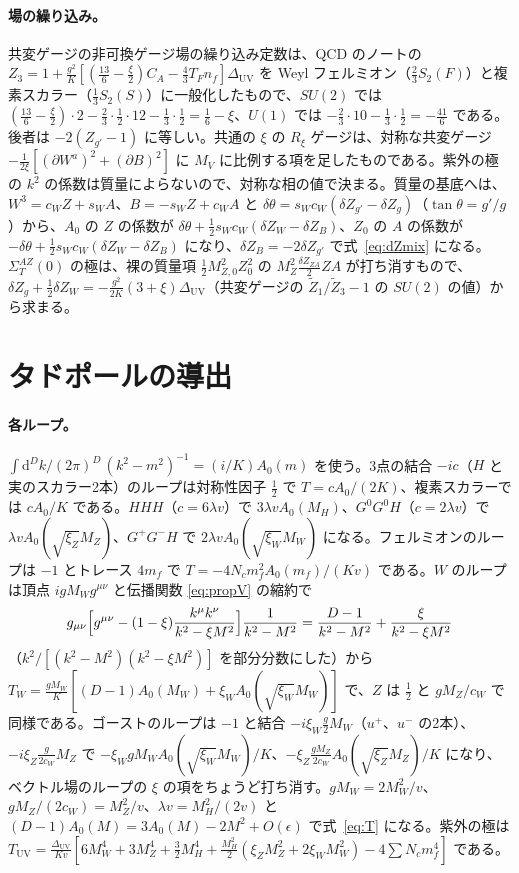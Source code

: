 \documentclass[a4paper,10pt]{ltjsarticle}
\newcommand{\dd}{\mathrm{d}}
\newcommand{\DUV}{\Delta_{\mathrm{UV}}}
\newcommand{\sw}{s_W}
\newcommand{\cw}{c_W}
\begin{document}
\paragraph{場の繰り込み。}共変ゲージの非可換ゲージ場の繰り込み定数は、QCD のノートの $Z_3=1+\frac{g^2}K[(\frac{13}6-\frac\xi2)C_A-\frac43T_Fn_f]\DUV$ を Weyl フェルミオン（$\frac23S_2(F)$）と複素スカラー（$\frac13S_2(S)$）に一般化したもので、$SU(2)$ では $(\frac{13}6-\frac\xi2)\cdot2-\frac23\cdot\frac12\cdot12-\frac13\cdot\frac12=\frac16-\xi$、$U(1)$ では $-\frac23\cdot10-\frac13\cdot\frac12=-\frac{41}6$ である。後者は $-2(Z_{g'}-1)$ に等しい。共通の $\xi$ の $R_\xi$ ゲージは、対称な共変ゲージ $-\frac1{2\xi}[(\partial W^a)^2+(\partial B)^2]$ に $M_V$ に比例する項を足したものである。紫外の極の $k^2$ の係数は質量によらないので、対称な相の値で決まる。質量の基底へは、$W^3=\cw Z+\sw A$、$B=-\sw Z+\cw A$ と $\delta\theta=\sw\cw(\delta Z_{g'}-\delta Z_g)$（$\tan\theta=g'/g$）から、$A_0$ の $Z$ の係数が $\delta\theta+\frac12\sw\cw(\delta Z_W-\delta Z_B)$、$Z_0$ の $A$ の係数が $-\delta\theta+\frac12\sw\cw(\delta Z_W-\delta Z_B)$ になり、$\delta Z_B=-2\delta Z_{g'}$ で式~\eqref{eq:dZmix} になる。$\Sigma^{AZ}_T(0)$ の極は、裸の質量項 $\frac12M_{Z,0}^2Z_0^2$ の $M_Z^2\frac{\delta Z_{ZA}}2ZA$ が打ち消すもので、$\delta Z_g+\frac12\delta Z_W=-\frac{g^2}{2K}(3+\xi)\DUV$（共変ゲージの $\tilde Z_1/\tilde Z_3-1$ の $SU(2)$ の値）から求まる。

\section{タドポールの導出}\label{app:tadpole}

\paragraph{各ループ。}$\int\dd^Dk/(2\pi)^D\,(k^2-m^2)^{-1}=(i/K)A_0(m)$ を使う。3点の結合 $-ic$（$H$ と実のスカラー2本）のループは対称性因子 $\frac12$ で $T=cA_0/(2K)$、複素スカラーでは $cA_0/K$ である。$HHH$（$c=6\lambda v$）で $3\lambda vA_0(M_H)$、$G^0G^0H$（$c=2\lambda v$）で $\lambda vA_0(\sqrt{\xi_Z}M_Z)$、$G^+G^-H$ で $2\lambda vA_0(\sqrt{\xi_W}M_W)$ になる。フェルミオンのループは $-1$ とトレース $4m_f$ で $T=-4N_cm_f^2A_0(m_f)/(Kv)$ である。$W$ のループは頂点 $igM_Wg^{\mu\nu}$ と伝播関数 \eqref{eq:propV} の縮約で
\begin{equation*}
g_{\mu\nu}\Bigl[g^{\mu\nu}-(1-\xi)\frac{k^\mu k^\nu}{k^2-\xi M^2}\Bigr]\frac1{k^2-M^2}=\frac{D-1}{k^2-M^2}+\frac{\xi}{k^2-\xi M^2}
\end{equation*}
（$k^2/[(k^2-M^2)(k^2-\xi M^2)]$ を部分分数にした）から $T_W=\frac{gM_W}K[(D-1)A_0(M_W)+\xi_WA_0(\sqrt{\xi_W}M_W)]$ で、$Z$ は $\frac12$ と $gM_Z/\cw$ で同様である。ゴーストのループは $-1$ と結合 $-i\xi_W\frac g2M_W$（$u^+$、$u^-$ の2本）、$-i\xi_Z\frac{g}{2\cw}M_Z$ で $-\xi_WgM_WA_0(\sqrt{\xi_W}M_W)/K$、$-\xi_Z\frac{gM_Z}{2\cw}A_0(\sqrt{\xi_Z}M_Z)/K$ になり、ベクトル場のループの $\xi$ の項をちょうど打ち消す。$gM_W=2M_W^2/v$、$gM_Z/(2\cw)=M_Z^2/v$、$\lambda v=M_H^2/(2v)$ と $(D-1)A_0(M)=3A_0(M)-2M^2+O(\epsilon)$ で式~\eqref{eq:T} になる。紫外の極は $T_{\mathrm{UV}}=\frac{\DUV}{Kv}[6M_W^4+3M_Z^4+\frac32M_H^4+\frac{M_H^2}2(\xi_ZM_Z^2+2\xi_WM_W^2)-4\sum N_cm_f^4]$ である。
\end{document}
